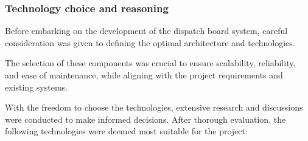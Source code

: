 \documentclass[10pt]{article}
\begin{document}
        \subsubsection{Technology choice and reasoning}
        Before embarking on the development of the dispatch board system, careful consideration was given to defining the optimal architecture and technologies. 

        The selection of these components was crucial to ensure scalability, reliability, and ease of maintenance, while aligning with the project requirements and existing systems.

        With the freedom to choose the technologies, extensive research and discussions were conducted to make informed decisions. After thorough evaluation, the following technologies were deemed most suitable for the project:
\end{document}
